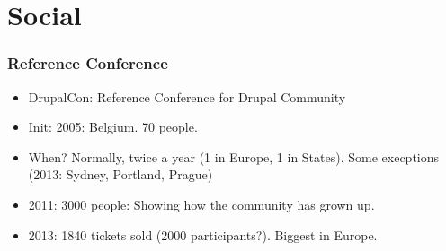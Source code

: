 \section{Social}

% 
\begin{frame}[allowframebreaks]
\frametitle{Reference Conference}

\begin{itemize}
\item DrupalCon: Reference Conference for Drupal Community
\item Init: 2005: Belgium. 70 people.
\item When? Normally, twice a year (1 in Europe, 1 in States). Some execptions (2013: Sydney, Portland, Prague)
\item 2011: 3000 people: Showing how the community has grown up.
\item 2013: 1840 tickets sold (2000 participants?). Biggest in Europe.
\end{itemize}

\end{frame}
